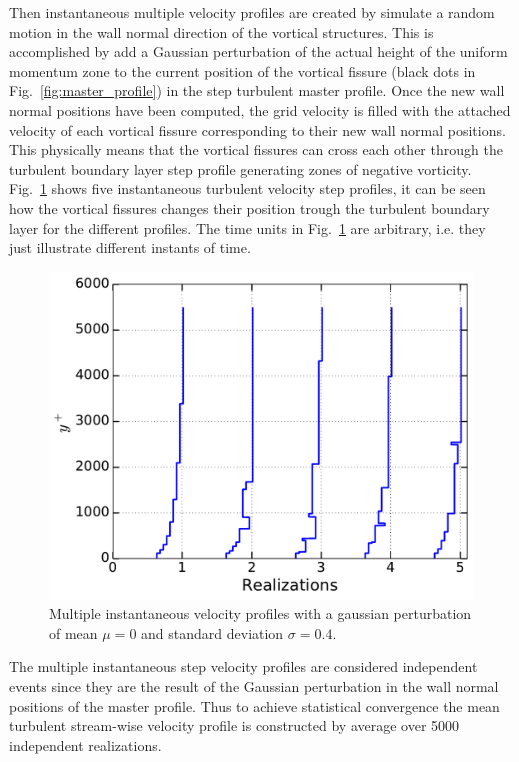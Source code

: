\documentclass[aps,reprint,amsmath,amssymb,pra]{revtex4-1}%
\begin{document}
Then instantaneous multiple velocity profiles are created by simulate a random motion in the wall normal direction  of the vortical structures. This is accomplished by add a Gaussian perturbation of the actual height of the uniform momentum zone to the current position of the vortical fissure (black dots in Fig.~\ref{fig:master_profile}) in the step turbulent master profile. Once the new wall normal positions have been computed, the grid velocity is filled with the attached velocity of each vortical fissure corresponding to their new wall normal positions. This physically means that the vortical fissures can cross each other through the turbulent boundary layer step profile generating zones of negative vorticity. Fig.~\ref{fig:mul_profiles} shows five instantaneous turbulent velocity step profiles, it can be seen how the vortical fissures changes their position trough the turbulent boundary layer for the different profiles. The time units in Fig.~\ref{fig:mul_profiles} are arbitrary, i.e. they just illustrate different instants of time. 
\begin{figure}[b]
\includegraphics[scale=0.46]{figures/multiple_instantaneous_vprof}
\caption{\label{fig:mul_profiles} Multiple instantaneous velocity profiles with a gaussian perturbation of mean $\mu=0$ and standard deviation $\sigma=0.4$.}
\end{figure}
The multiple instantaneous step velocity profiles are considered independent events since they are the result of the Gaussian perturbation in the wall normal positions of the master profile. Thus to achieve statistical convergence the mean turbulent stream-wise velocity profile is constructed by average over 5000 independent realizations.
\end{document}
